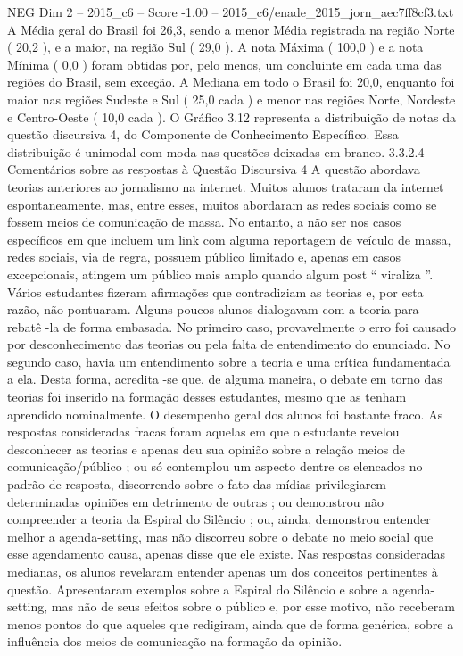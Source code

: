 \begin{textsample}{NEG Dim 2 – 2015\_c6 – Score -1.00 – 2015\_c6/enade\_2015\_jorn\_aec7ff8cf3.txt}
A Média geral do Brasil foi 26,3, sendo a menor Média registrada na região Norte ( 20,2 ), e a maior, na região Sul ( 29,0 ).
A nota Máxima ( 100,0 ) e a nota Mínima ( 0,0 ) foram obtidas por, pelo menos, um concluinte em cada uma das regiões do Brasil, sem exceção.
A Mediana em todo o Brasil foi 20,0, enquanto foi maior nas regiões Sudeste e Sul ( 25,0 cada ) e menor nas regiões Norte, Nordeste e Centro-Oeste ( 10,0 cada ).
O Gráfico 3.12 representa a distribuição de notas da questão discursiva 4, do Componente de Conhecimento Específico.
Essa distribuição é unimodal com moda nas questões deixadas em branco. 3.3.2.4 Comentários sobre as respostas à Questão Discursiva 4 A questão abordava teorias anteriores ao jornalismo na internet.
Muitos alunos trataram da internet espontaneamente, mas, entre esses, muitos abordaram as redes sociais como se fossem meios de comunicação de massa.
No entanto, a não ser nos casos específicos em que incluem um link com alguma reportagem de veículo de massa, redes sociais, via de regra, possuem público limitado e, apenas em casos excepcionais, atingem um público mais amplo quando algum post “ viraliza ”.
Vários estudantes fizeram afirmações que contradiziam as teorias e, por esta razão, não pontuaram.
Alguns poucos alunos dialogavam com a teoria para rebatê -la de forma embasada.
No primeiro caso, provavelmente o erro foi causado por desconhecimento das teorias ou pela falta de entendimento do enunciado.
No segundo caso, havia um entendimento sobre a teoria e uma crítica fundamentada a ela.
Desta forma, acredita -se que, de alguma maneira, o debate em torno das teorias foi inserido na formação desses estudantes, mesmo que as tenham aprendido nominalmente.
O desempenho geral dos alunos foi bastante fraco.
As respostas consideradas fracas foram aquelas em que o estudante revelou desconhecer as teorias e apenas deu sua opinião sobre a relação meios de comunicação/público ; ou só contemplou um aspecto dentre os elencados no padrão de resposta, discorrendo sobre o fato das mídias privilegiarem determinadas opiniões em detrimento de outras ; ou demonstrou não compreender a teoria da Espiral do Silêncio ; ou, ainda, demonstrou entender melhor a agenda-setting, mas não discorreu sobre o debate no meio social que esse agendamento causa, apenas disse que ele existe.
Nas respostas consideradas medianas, os alunos revelaram entender apenas um dos conceitos pertinentes à questão.
Apresentaram exemplos sobre a Espiral do Silêncio e sobre a agenda-setting, mas não de seus efeitos sobre o público e, por esse motivo, não receberam menos pontos do que aqueles que redigiram, ainda que de forma genérica, sobre a influência dos meios de comunicação na formação da opinião.

\end{textsample}
